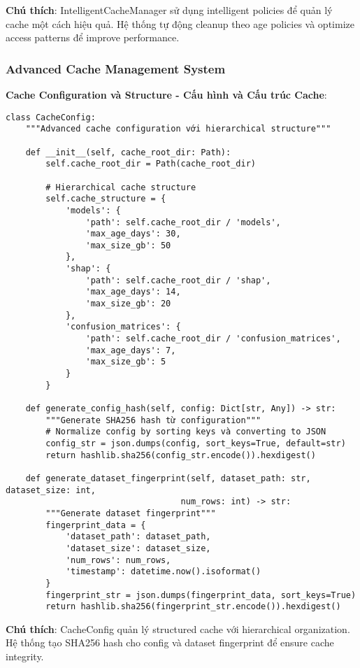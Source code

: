 \textbf{Chú thích}: IntelligentCacheManager sử dụng intelligent policies để quản lý cache một cách hiệu quả. Hệ thống tự động cleanup theo age policies và optimize access patterns để improve performance.

\subsubsection{Advanced Cache Management System}

\textbf{Cache Configuration và Structure - Cấu hình và Cấu trúc Cache}:

\begin{verbatim}
class CacheConfig:
    """Advanced cache configuration với hierarchical structure"""
    
    def __init__(self, cache_root_dir: Path):
        self.cache_root_dir = Path(cache_root_dir)
        
        # Hierarchical cache structure
        self.cache_structure = {
            'models': {
                'path': self.cache_root_dir / 'models',
                'max_age_days': 30,
                'max_size_gb': 50
            },
            'shap': {
                'path': self.cache_root_dir / 'shap',
                'max_age_days': 14,
                'max_size_gb': 20
            },
            'confusion_matrices': {
                'path': self.cache_root_dir / 'confusion_matrices',
                'max_age_days': 7,
                'max_size_gb': 5
            }
        }
        
    def generate_config_hash(self, config: Dict[str, Any]) -> str:
        """Generate SHA256 hash từ configuration"""
        # Normalize config by sorting keys và converting to JSON
        config_str = json.dumps(config, sort_keys=True, default=str)
        return hashlib.sha256(config_str.encode()).hexdigest()
        
    def generate_dataset_fingerprint(self, dataset_path: str, dataset_size: int, 
                                   num_rows: int) -> str:
        """Generate dataset fingerprint"""
        fingerprint_data = {
            'dataset_path': dataset_path,
            'dataset_size': dataset_size,
            'num_rows': num_rows,
            'timestamp': datetime.now().isoformat()
        }
        fingerprint_str = json.dumps(fingerprint_data, sort_keys=True)
        return hashlib.sha256(fingerprint_str.encode()).hexdigest()
\end{verbatim}

\textbf{Chú thích}: CacheConfig quản lý structured cache với hierarchical organization. Hệ thống tạo SHA256 hash cho config và dataset fingerprint để ensure cache integrity.


